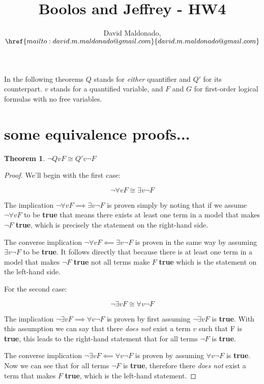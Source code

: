 \documentclass[a4paper,11pt]{article}
\author{David Maldonado, $\href{mailto:david.m.maldonado@gmail.com}%
{david.m.maldonado@gmail.com}$}
\title{Boolos and Jeffrey - HW4}
\newtheorem{thm}{Theorem}[section]
\begin{document}
\maketitle

\bigskip


In the following theorems $Q$ stands for \textit{either} quantifier and $Q'$ for its counterpart. $v$ stands for 
a quantified variable, and $F$ and $G$ for first-order logical formulas with no free variables.


\section{some equivalence proofs...}

\begin{thm}$\lnot Qv F \cong Q'v \lnot F $\end{thm}
	
	\begin{proof}
		We'll begin with the first case: 
		
		\begin{equation} \lnot \forall v F \cong \exists v \lnot F \end{equation}
		
		The implication $\lnot \forall v F \implies \exists v \lnot F$ is proven simply by noting that if we assume 
		$\lnot \forall v F$ to be \textbf{true} that means there exists at least one term in a model that makes 
		$\lnot F$ \textbf{true}, which is precisely the statement on the right-hand side.
		
		The converse implication $\lnot \forall v F \impliedby \exists v \lnot F$ is proven in the same way by
		assuming $\exists v \lnot F$ to be \textbf{true}. It follows directly that because there is at least one term
		in a model that makes $\lnot F$ \textbf{true} not all terms make $F$ \textbf{true} which is the statement 			on the left-hand side.
		
		\bigskip
		
		For the second case:
		
		\begin{equation} \lnot \exists v F \cong \forall v \lnot F \end{equation}
		
		The implication $\lnot \exists v F \implies \forall v \lnot F$ is proven by first assuming $\lnot \exists v F$ 
		is \textbf{true}. With this assumption we can say that there \emph{does not} exist a term $v$ such that F is 
		\textbf{true}, this leads to the right-hand statement that for all terms $\lnot F$ is \textbf{true}.
		
		The converse implication $\lnot \exists v F \impliedby \forall v \lnot F$ is proven by assuming 
		$\forall v \lnot F$ is \textbf{true}. Now we can see that for all terms $\lnot F$ is \textbf{true}, therefore
		there \emph{does not} exist a term that makes $F$ \textbf{true}, which is the left-hand statement.
	\end{proof}
	
\end{document}
